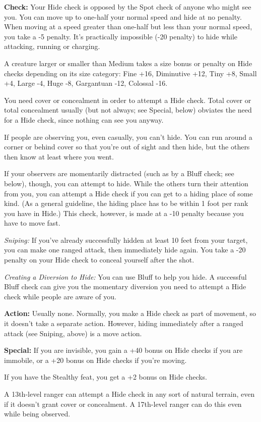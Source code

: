 \textbf{Check:} Your Hide check is opposed by the Spot check of anyone who might see you. You can move up to one-half your normal speed and hide at no penalty. When moving at a speed greater than one-half but less than your normal speed, you take a -5 penalty. It’s practically impossible (-20 penalty) to hide while attacking, running or charging.

A creature larger or smaller than Medium takes a size bonus or penalty on Hide checks depending on its size category: Fine +16, Diminutive +12, Tiny +8, Small +4, Large -4, Huge -8, Gargantuan -12, Colossal -16.

You need cover or concealment in order to attempt a Hide check. Total cover or total concealment usually (but not always; see Special, below) obviates the need for a Hide check, since nothing can see you anyway.

If people are observing you, even casually, you can’t hide. You can run around a corner or behind cover so that you’re out of sight and then hide, but the others then know at least where you went.

If your observers are momentarily distracted (such as by a Bluff check; see below), though, you can attempt to hide. While the others turn their attention from you, you can attempt a Hide check if you can get to a hiding place of some kind. (As a general guideline, the hiding place has to be within 1 foot per rank you have in Hide.) This check, however, is made at a -10 penalty because you have to move fast.

\textit{Sniping:} If you’ve already successfully hidden at least 10 feet from your target, you can make one ranged attack, then immediately hide again. You take a -20 penalty on your Hide check to conceal yourself after the shot.

\textit{Creating a Diversion to Hide:} You can use Bluff to help you hide. A successful Bluff check can give you the momentary diversion you need to attempt a Hide check while people are aware of you.

\textbf{Action:} Usually none. Normally, you make a Hide check as part of movement, so it doesn’t take a separate action. However, hiding immediately after a ranged attack (see Sniping, above) is a move action.

\textbf{Special:} If you are invisible, you gain a +40 bonus on Hide checks if you are immobile, or a +20 bonus on Hide checks if you’re moving.

If you have the Stealthy feat, you get a +2 bonus on Hide checks.

A 13th-level ranger can attempt a Hide check in any sort of natural terrain, even if it doesn’t grant cover or concealment. A 17th-level ranger can do this even while being observed.